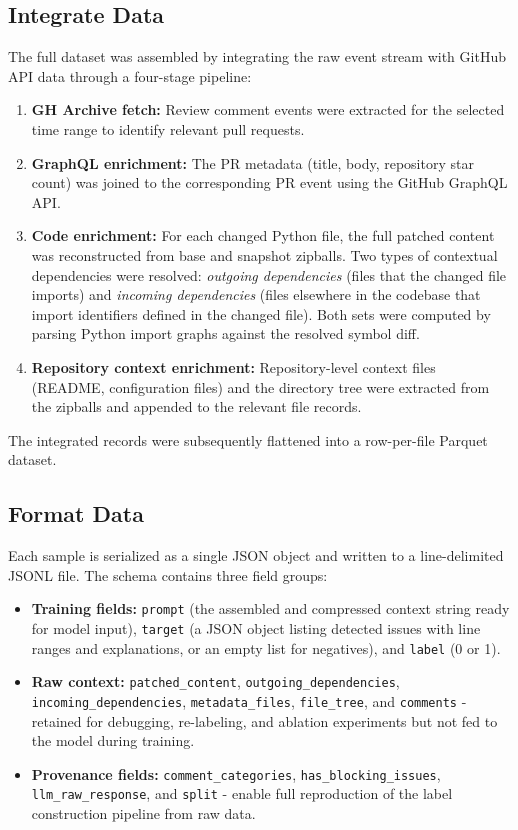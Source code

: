 \documentclass[11pt]{article}
\begin{document}
\subsection*{Integrate Data}

The full dataset was assembled by integrating the raw event stream with GitHub API data through a four-stage pipeline:

\begin{enumerate}
    \item \textbf{GH Archive fetch:} Review comment events were extracted for the selected time range to identify relevant pull requests.
    \item \textbf{GraphQL enrichment:} The PR metadata (title, body, repository star count) was joined to the corresponding PR event using the GitHub GraphQL API.
    \item \textbf{Code enrichment:} For each changed Python file, the full patched content was reconstructed from base and snapshot zipballs. Two types of contextual dependencies were resolved: \textit{outgoing dependencies} (files that the changed file imports) and \textit{incoming dependencies} (files elsewhere in the codebase that import identifiers defined in the changed file). Both sets were computed by parsing Python import graphs against the resolved symbol diff.
    \item \textbf{Repository context enrichment:} Repository-level context files (README, configuration files) and the directory tree were extracted from the zipballs and appended to the relevant file records.
\end{enumerate}

The integrated records were subsequently flattened into a row-per-file Parquet dataset.

\subsection*{Format Data}

Each sample is serialized as a single JSON object and written to a line-delimited JSONL file. The schema contains three field groups:

\begin{itemize}
    \item \textbf{Training fields:} \texttt{prompt} (the assembled and compressed context string ready for model input), \texttt{target} (a JSON object listing detected issues with line ranges and explanations, or an empty list for negatives), and \texttt{label} (0 or 1).
    \item \textbf{Raw context:} \texttt{patched\_content}, \texttt{outgoing\_dependencies}, \texttt{incoming\_dependencies}, \texttt{metadata\_files}, \texttt{file\_tree}, and \texttt{comments} - retained for debugging, re-labeling, and ablation experiments but not fed to the model during training.
    \item \textbf{Provenance fields:} \texttt{comment\_categories}, \texttt{has\_blocking\_issues}, \texttt{llm\_raw\_response}, and \texttt{split} - enable full reproduction of the label construction pipeline from raw data.
\end{itemize}
\end{document}
